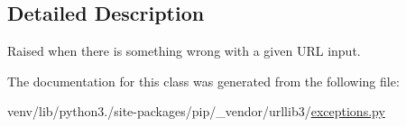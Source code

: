\subsection{Detailed Description}
\begin{DoxyVerb}Raised when there is something wrong with a given URL input.\end{DoxyVerb}
 

The documentation for this class was generated from the following file\+:\begin{DoxyCompactItemize}
\item 
venv/lib/python3./site-\/packages/pip/\+\_\+vendor/urllib3/\hyperlink{pip_2__vendor_2urllib3_2exceptions_8py}{exceptions.\+py}\end{DoxyCompactItemize}
